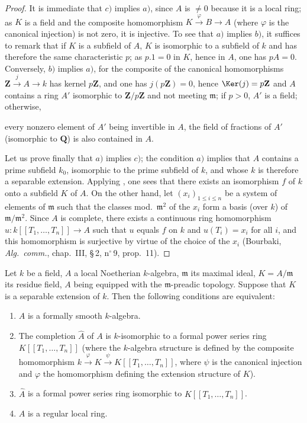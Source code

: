 \begin{proof}
It is immediate that $c)$ implies $a)$, since $A$ is $\neq 0$ because it is a local ring;
as $K$ is a field and the composite homomorphism $K\xrightarrow{\varphi}B\to A$ (where $\varphi$ is the canonical injection) is not zero, it is injective.
To see that $a)$ implies $b)$, it suffices to remark that if $K$ is a subfield of $A$, $K$ is isomorphic to a subfield of $k$ and has therefore the same characteristic $p$;
as $p.1=0$ in $K$, hence in $A$, one has $pA=0$.
Conversely, $b)$ implies $a)$, for the composite of the canonical homomorphisms $\mathbf{Z}\xrightarrow{j}A\to k$ has kernel $p\mathbf{Z}$, and one has $j(p\mathbf{Z})=0$, hence $\Ker(j)=p\mathbf{Z}$ and $A$ contains a ring $A'$ isomorphic to $\mathbf{Z}/p\mathbf{Z}$ and not meeting $\mathfrak{m}$;
if $p>0$, $A'$ is a field; otherwise,


every nonzero element of $A'$ being invertible in $A$, the field of fractions of $A'$ (isomorphic to $\mathbf{Q}$) is also contained in $A$.

Let us prove finally that $a)$ implies $c)$;
the condition $a)$ implies that $A$ contains a prime subfield $k_0$, isomorphic to the prime subfield of $k$, and whose $k$ is therefore a separable extension.
Applying , one sees that there exists an isomorphism $f$ of $k$ onto a subfield $K$ of $A$.
On the other hand, let $(x_i)_{1\leq i\leq n}$ be a system of elements of $\mathfrak{m}$ such that the classes mod.\ $\mathfrak{m}^2$ of the $x_i$ form a basis (over $k$) of $\mathfrak{m}/\mathfrak{m}^2$.
Since $A$ is complete, there exists a continuous ring homomorphism $u:k[[T_1,\ldots,T_n]]\to A$ such that $u$ equals $f$ on $k$ and $u(T_i)=x_i$ for all $i$, and this homomorphism is surjective by virtue of the choice of the $x_i$ (Bourbaki, \emph{Alg.\ comm.}, chap.~III, \S\,2, n$^\circ$\,9, prop.~11).
\end{proof}

\begin{theorem}[19.6.4]
\label{0.19.6.4}
Let $k$ be a field, $A$ a local Noetherian $k$-algebra, $\mathfrak{m}$ its maximal ideal, $K=A/\mathfrak{m}$ its residue field, $A$ being equipped with the $\mathfrak{m}$-preadic topology.
Suppose that $K$ is a separable extension of $k$.
Then the following conditions are equivalent:
\begin{enumerate}
  \item[a)] $A$ is a formally smooth $k$-algebra.
  \item[b)] The completion $\widehat{A}$ of $A$ is $k$-isomorphic to a formal power series ring $K[[T_1,\ldots,T_n]]$ (where the $k$-algebra structure is defined by the composite homomorphism $k\xrightarrow{\varphi}K\xrightarrow{\psi}K[[T_1,\ldots,T_n]]$, where $\psi$ is the canonical injection and $\varphi$ the homomorphism defining the extension structure of $K$).
  \item[b')] $\widehat{A}$ is a formal power series ring isomorphic to $K[[T_1,\ldots,T_n]]$.
  \item[c)] $A$ is a regular local ring.
\end{enumerate}
\end{theorem}

